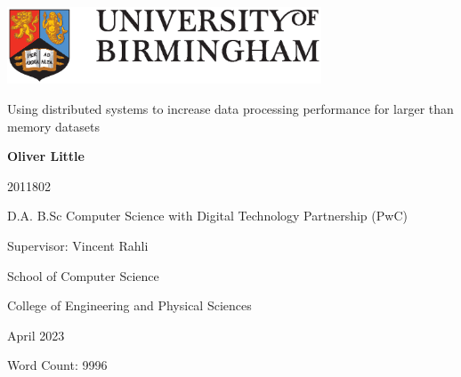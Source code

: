 \begin{titlepage}
	\begin{center}
		\vspace*{1cm}
		
		\includegraphics[width=0.7\textwidth]{uob-logo.eps}
		
		\vspace{1.5cm}
		
		\huge
		Using distributed systems to increase data processing performance for larger than memory datasets
		
		
		
		\vspace{2cm}
		
		\large
		\textbf{Oliver Little}
		
		\vspace{0.25cm}
		
		\small 2011802
		
		\vspace{0.25cm}
		
		\large
		D.A. B.Sc Computer Science with Digital Technology Partnership (PwC)
		
		\vspace{1.5cm}
		
		Supervisor: Vincent Rahli
		
		\vspace{1.5cm}
		
		\large
		School of Computer Science
		
		\large
		College of Engineering and Physical Sciences
		
		\large
		April 2023
		
		\vspace{1.5cm}
		
		\normalsize
		Word Count: 9996
		
	\end{center}
\end{titlepage}